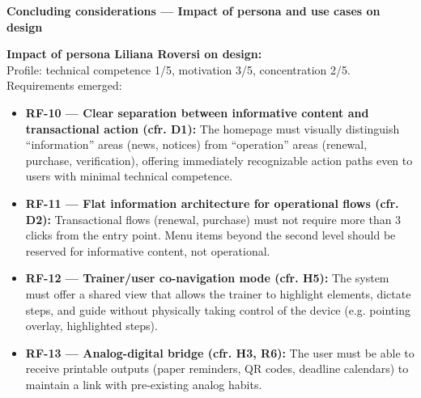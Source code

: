 ﻿\documentclass[11pt,a4paper]{article}
\begin{document}
\newpage

% 


\begin{tcolorbox}[sectionbox,colback=primaryColor!10]
    \textbf{Concluding considerations --- Impact of persona and use cases on design}
\end{tcolorbox}

\vspace{0.3cm}

\begin{tcolorbox}[base]
    {\small
    \textbf{Impact of persona Liliana Roversi on design:} \\[4pt]
    Profile: technical competence 1/5, motivation 3/5, concentration 2/5. Requirements emerged:

    \begin{itemize}[leftmargin=*]
        \item \textbf{RF-10 --- Clear separation between informative content and transactional action (cfr. D1):} The homepage must visually distinguish ``information'' areas (news, notices) from ``operation'' areas (renewal, purchase, verification), offering immediately recognizable action paths even to users with minimal technical competence.

        \item \textbf{RF-11 --- Flat information architecture for operational flows (cfr. D2):} Transactional flows (renewal, purchase) must not require more than 3 clicks from the entry point. Menu items beyond the second level should be reserved for informative content, not operational.

        \item \textbf{RF-12 --- Trainer/user co-navigation mode (cfr. H5):} The system must offer a shared view that allows the trainer to highlight elements, dictate steps, and guide without physically taking control of the device (e.g. pointing overlay, highlighted steps).

        \item \textbf{RF-13 --- Analog-digital bridge (cfr. H3, R6):} The user must be able to receive printable outputs (paper reminders, QR codes, deadline calendars) to maintain a link with pre-existing analog habits.
    \end{itemize}
    }
\end{tcolorbox}
\end{document}
